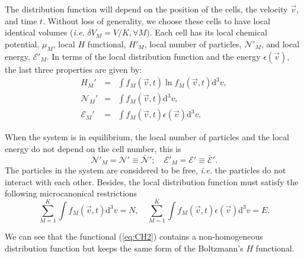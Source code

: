 The distribution function will depend on the position of the cells, the velocity
$\vec{v}$, and time $t$. Without loss of generality, we choose these cells to
have local identical volumes (\textit{i.e.} $\delta V_M = V/K, \forall M$).
Each cell has its local chemical potential, $\mu_M$, local
$H$ functional, $H'_M$, local number of particles, $\mathcal{N}'_M$, and local
energy, $\mathcal{E}'_M$. In terms of the local distribution 
function and the energy $\epsilon(\vec{v})$, the last three properties are
given by:
%
\begin{eqnarray}
    H_M' & = &  \int f_M(\vec{v},t) \ln f_{M}(\vec{v},t)
      \mathrm{d}^{3}v \label{Hcell},\nonumber\\
    \mathcal{N}_M' & = & \int f_{M}(\vec{v} ,t) \mathrm{d}^{3}v, \nonumber\\
    \mathcal{E}_M' & = & \int f_{M}(\vec{v},t)\epsilon(\vec{v}) \mathrm{d}^{3}v.
\end{eqnarray}
%

When the system is in equilibrium, the local number of particles and the local
energy do not depend on the cell number, this is
%
\begin{equation}
   \mathcal{N}'_M=\mathcal{N}'\equiv \bar{\mathcal{N}}';
   \quad\mathcal{E}'_M=\mathcal{E}'\equiv\bar{\mathcal{E}}'.
\end{equation}
%
The particles in the system are considered to be free, \textit{i.e.} the
particles do not interact with each other. Besides, the local distribution
function must satisfy the following microcanonical restrictions 
%
\begin{equation}\label{micro}
    \sum_{M=1}^{K}\int f_M(\vec{v},t)\mathrm{d}^3v =N,
    \quad\sum_{M=1}^{K}\int f_M(\vec{v},t)\epsilon(\vec{v})\mathrm{d}^3v=E.
\end{equation}
%

We can see that the functional (\ref{eq:CH2}) contains a non-homogeneous
distribution function but keeps the same form of the Boltzmann's $H$ functional.

